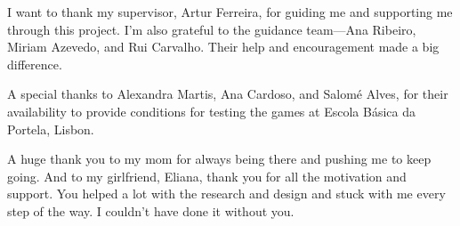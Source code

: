 \acknowledgements

I want to thank my supervisor, Artur Ferreira, for guiding me and supporting me through this project. I’m also grateful to the guidance team—Ana Ribeiro, Miriam Azevedo, and Rui Carvalho. Their help and encouragement made a big difference.

A special thanks to Alexandra Martis, Ana Cardoso, and Salomé Alves, for their availability to provide conditions for testing the games at Escola Básica da Portela, Lisbon.

A huge thank you to my mom for always being there and pushing me to keep going. And to my girlfriend, Eliana, thank you for all the motivation and support. You helped a lot with the research and design and stuck with me every step of the way. I couldn’t have done it without you.